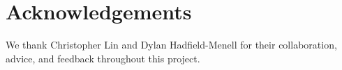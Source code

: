 \section{Acknowledgements}
We thank Christopher Lin and Dylan Hadfield-Menell for their collaboration, advice, and feedback
throughout this project.